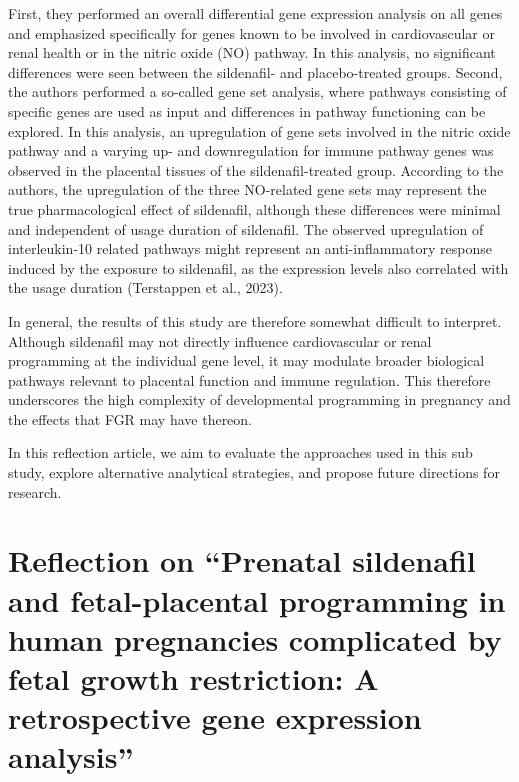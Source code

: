 \documentclass[authordate, reflection,issue]{jote-new-article}
\begin{document}
	First, they performed an overall differential gene expression analysis on all genes and emphasized specifically for genes known to be involved in cardiovascular or renal health or in the nitric oxide (NO) pathway. In this analysis, no significant differences were seen between the sildenafil- and placebo-treated groups. Second, the authors performed a so-called gene set analysis, where pathways consisting of specific genes are used as input and differences in pathway functioning can be explored. In this analysis, an upregulation of gene sets involved in the nitric oxide pathway and a varying up- and downregulation for immune pathway genes was observed in the placental tissues of the sildenafil-treated group. According to the authors, the upregulation of the three NO-related gene sets may represent the true pharmacological effect of sildenafil, although these differences were minimal and independent of usage duration of sildenafil. The observed upregulation of interleukin-10 related pathways might represent an anti-inflammatory response induced by the exposure to sildenafil, as the expression levels also correlated with the usage duration (Terstappen et al., 2023).



	In general, the results of this study are therefore somewhat difficult to interpret. Although sildenafil may not directly influence cardiovascular or renal programming at the individual gene level, it may modulate broader biological pathways relevant to placental function and immune regulation. This therefore underscores the high complexity of developmental programming in pregnancy and the effects that FGR may have thereon.



	In this reflection article, we aim to evaluate the approaches used in this sub study, explore alternative analytical strategies, and propose future directions for research.







	\section{Reflection on “Prenatal sildenafil and fetal-placental programming in human pregnancies complicated by fetal growth restriction: A retrospective gene expression analysis”}
\end{document}
